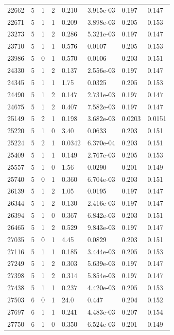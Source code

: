 \documentclass[preview]{standalone}
\begin{document}
{{{\begin{tabular}{L{1.2cm}C{1.2cm} C{0.3cm}C{0.5cm} C{1.4cm}C{1.4cm} C{1.4cm}C{1.4cm}}
  22662  &     5  & 1     &  2 &  0.210  & 3.915e-03  & 0.197 &  0.147   \\ 
  22671  &     5  & 1     &  1 &  0.209  & 3.898e-03  & 0.205 &  0.153   \\ 
  23273  &     5  & 1     &  2 &  0.286  & 5.321e-03  & 0.197 &  0.147   \\ 
  23710  &     5  & 1     &  1 &  0.576  & 0.0107  & 0.205 &  0.153   \\ 
  23986  &     5  & 0     &  1 &  0.570  & 0.0106  & 0.203 &  0.151   \\ 
  24330  &     5  & 1     &  2 &  0.137  & 2.556e-03  & 0.197 &  0.147   \\ 
  24345  &     5  & 1     &  1 &  1.75  & 0.0325  & 0.205 &  0.153   \\ 
  24490  &     5  & 1     &  2 &  0.147  & 2.731e-03  & 0.197 &  0.147   \\ 
  24675  &     5  & 1     &  2 &  0.407  & 7.582e-03  & 0.197 &  0.147   \\ 
  25149  &     5  & 2     &  1 &  0.198  & 3.682e-03  & 0.0203 &  0.0151   \\ 
  25220  &     5  & 1     &  0 &  3.40  & 0.0633  & 0.203 &  0.151   \\ 
  25224  &     5  & 2     &  1 &  0.0342  & 6.370e-04  & 0.203 &  0.151   \\ 
  25409  &     5  & 1     &  1 &  0.149  & 2.767e-03  & 0.205 &  0.153   \\ 
  25557  &     5  & 1     &  0 &  1.56  & 0.0290  & 0.201 &  0.149   \\ 
  25740  &     5  & 0     &  1 &  0.360  & 6.704e-03  & 0.203 &  0.151   \\ 
  26139  &     5  & 1     &  2 &  1.05  & 0.0195  & 0.197 &  0.147   \\ 
  26344  &     5  & 1     &  2 &  0.130  & 2.416e-03  & 0.197 &  0.147   \\ 
  26394  &     5  & 1     &  0 &  0.367  & 6.842e-03  & 0.203 &  0.151   \\ 
  26465  &     5  & 1     &  2 &  0.529  & 9.843e-03  & 0.197 &  0.147   \\ 
  27035  &     5  & 0     &  1 &  4.45  & 0.0829  & 0.203 &  0.151   \\ 
  27116  &     5  & 1     &  1 &  0.185  & 3.444e-03  & 0.205 &  0.153   \\ 
  27249  &     5  & 1     &  2 &  0.303  & 5.639e-03  & 0.197 &  0.147   \\ 
  27398  &     5  & 1     &  2 &  0.314  & 5.854e-03  & 0.197 &  0.147   \\ 
  27438  &     5  & 1     &  1 &  0.237  & 4.420e-03  & 0.205 &  0.153   \\ 
  27503  &     6  & 0     &  1 &  24.0  & 0.447  & 0.204 &  0.152   \\ 
  27697  &     6  & 1     &  1 &  0.241  & 4.483e-03  & 0.207 &  0.154   \\ 
  27750  &     6  & 1     &  0 &  0.350  & 6.524e-03  & 0.201 &  0.149   \\ 
\hline 
\end{tabular} 

}}}
\end{document}
